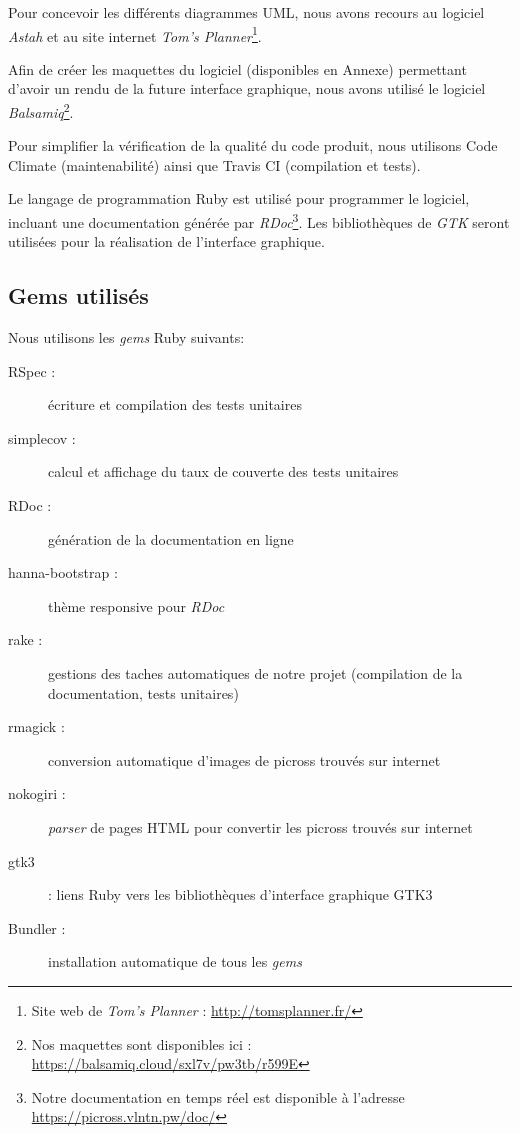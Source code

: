 \documentclass{report}
\makeatletter
\newcommand\footnoteref[1]{\protected@xdef\@thefnmark{\ref{#1}}\@footnotemark}
\makeatother
\begin{document}
	Pour concevoir les différents diagrammes UML, nous avons recours au logiciel \textit{Astah} et au site internet \textit{Tom's Planner}\footnote{Site web de \textit{Tom's Planner} : \url{http://tomsplanner.fr/}}.

	Afin de créer les maquettes du logiciel (disponibles en Annexe) permettant d'avoir un rendu de la future interface graphique, nous avons utilisé le logiciel \textit{Balsamiq}\footnote{Nos maquettes sont disponibles ici : \url{https://balsamiq.cloud/sxl7v/pw3tb/r599E}}.

	Pour simplifier la vérification de la qualité du code produit, nous utilisons Code Climate (maintenabilité) ainsi que Travis CI (compilation et tests).

	Le langage de programmation Ruby est utilisé pour programmer le logiciel, incluant une documentation générée par \textit{RDoc}\footnote{\label{rdoc}Notre documentation en temps réel est disponible à l'adresse \url{https://picross.vlntn.pw/doc/}}. Les bibliothèques de \textit{GTK} seront utilisées pour la réalisation de l'interface graphique.
	
	\subsection{Gems utilisés}
	Nous utilisons les \textit{gems} Ruby suivants:
	\begin{description}
	\item[RSpec :] écriture et compilation des tests unitaires
	\item[simplecov :] calcul et affichage du taux de couverte des tests unitaires
	\item[RDoc :] génération de la documentation en ligne \footnoteref{rdoc}
	\item[hanna-bootstrap :] thème responsive pour \textit{RDoc}
	\item[rake :] gestions des taches automatiques de notre projet (compilation de la documentation, tests unitaires)
	\item[rmagick :] conversion automatique d'images de picross trouvés sur internet
	\item[nokogiri :] \textit{parser} de pages HTML pour convertir les picross trouvés sur internet
	\item[gtk3] : liens Ruby vers les bibliothèques d'interface graphique GTK3
	\item[Bundler :] installation automatique de tous les \textit{gems}
	\end{description}
\end{document}
